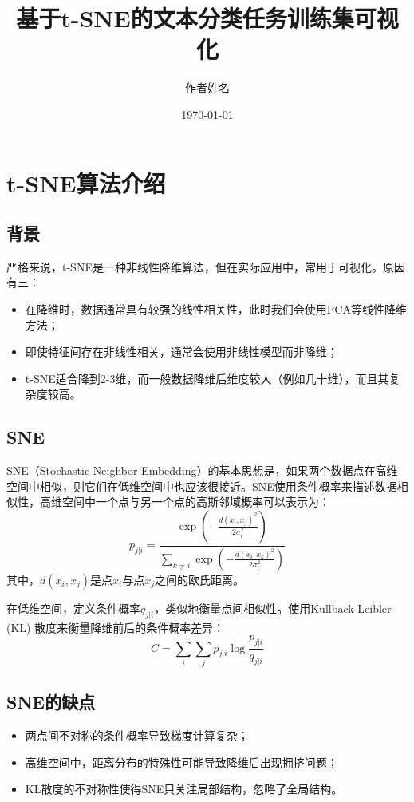 \documentclass[a4paper,12pt]{article}
\title{基于t-SNE的文本分类任务训练集可视化}
\author{作者姓名}
\date{\today}
\begin{document}
\maketitle

\section{t-SNE算法介绍}

\subsection{背景}
严格来说，t-SNE是一种非线性降维算法，但在实际应用中，常用于可视化。原因有三：
\begin{itemize}
    \item 在降维时，数据通常具有较强的线性相关性，此时我们会使用PCA等线性降维方法；
    \item 即使特征间存在非线性相关，通常会使用非线性模型而非降维；
    \item t-SNE适合降到2-3维，而一般数据降维后维度较大（例如几十维），而且其复杂度较高。
\end{itemize}

\subsection{SNE}
SNE（Stochastic Neighbor Embedding）的基本思想是，如果两个数据点在高维空间中相似，则它们在低维空间中也应该很接近。SNE使用条件概率来描述数据相似性，高维空间中一个点与另一个点的高斯邻域概率可以表示为：
\[
p_{j|i} = \frac{\exp\left(-\frac{d(x_i, x_j)^2}{2\sigma_i^2}\right)}{\sum_{k \neq i} \exp\left(-\frac{d(x_i, x_k)^2}{2\sigma_i^2}\right)}
\]
其中，$d(x_i, x_j)$是点$x_i$与点$x_j$之间的欧氏距离。

在低维空间，定义条件概率$q_{j|i}$，类似地衡量点间相似性。使用Kullback-Leibler (KL) 散度来衡量降维前后的条件概率差异：
\[
C = \sum_i \sum_j p_{j|i} \log \frac{p_{j|i}}{q_{j|i}}
\]

\subsection{SNE的缺点}
\begin{itemize}
    \item 两点间不对称的条件概率导致梯度计算复杂；
    \item 高维空间中，距离分布的特殊性可能导致降维后出现拥挤问题；
    \item KL散度的不对称性使得SNE只关注局部结构，忽略了全局结构。
\end{itemize}
\end{document}
